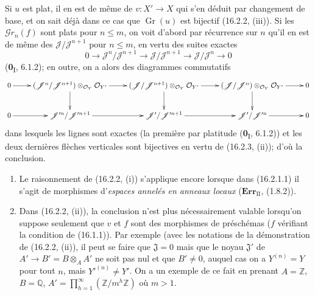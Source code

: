Si $u$ est plat, il en est de même de $v:X'\to X$ qui s'en déduit par
changement de base, et on sait déjà dans ce cas que $\operatorname{Gr}(u)$ est
bijectif (16.2.2, (iii)). Si les $\mathscr{G}r_n(f)$ sont plats pour
$n\leq m$, on voit d'abord par récurrence sur $n$ qu'il en est de même des
$\mathscr{J}/\mathscr{J}^{n+1}$ pour $n\leq m$, en vertu des suites exactes
\[
  0\longrightarrow\mathscr{J}^n/\mathscr{J}^{n+1}
  \longrightarrow\mathscr{J}/\mathscr{J}^{n+1}
  \longrightarrow\mathscr{J}/\mathscr{J}^n
  \longrightarrow 0
\]
(\textbf{0}\textsubscript{I}, 6.1.2); en outre, on a alors des diagrammes commutatifs
\[
  \xymatrix{
    0 \ar[r] &
    (\mathscr{J}^n/\mathscr{J}^{n+1})
      \otimes_{\mathcal{O}_Y}\mathcal{O}_{Y'}
      \ar[r]\ar[d] &
    (\mathscr{J}/\mathscr{J}^{n+1})
      \otimes_{\mathcal{O}_Y}\mathcal{O}_{Y'}
      \ar[r]\ar[d] &
    (\mathscr{J}/\mathscr{J}^n)
      \otimes_{\mathcal{O}_Y}\mathcal{O}_{Y'}
      \ar[r]\ar[d] & 0 \\
    0 \ar[r] &
    \mathscr{J}'^n/\mathscr{J}'^{n+1}
      \ar[r] &
    \mathscr{J}'/\mathscr{J}'^{n+1}
      \ar[r] &
    \mathscr{J}'/\mathscr{J}'^n
      \ar[r] & 0
  }
\]
dans lesquels les lignes sont exactes (la première par platitude
(\textbf{0}\textsubscript{I}, 6.1.2)) et les deux dernières flèches verticales sont
bijectives en vertu de (16.2.3, (ii)); d'où la conclusion.

\begin{remarks}[16.2.5]
\label{IV.16.2.5}
\begin{enumerate}
\item[(i)] Le raisonnement de (16.2.2, (i)) s'applique encore lorsque dans
(16.2.1.1) il s'agit de morphismes d'\emph{espaces annelés en anneaux locaux}
($\mathbf{Err}_{\mathrm{II}}$, (1.8.2)).
\item[(ii)] Dans (16.2.2, (ii)), la conclusion n'est plus nécessairement valable
lorsqu'on suppose seulement que $v$ et $f$ sont des morphismes de préschémas
($f$ vérifiant la condition de (16.1.1)). Par exemple (avec les notations de la
démonstration de (16.2.2, (ii)), il peut se faire que $\mathfrak{J}=0$ mais que
le noyau $\mathfrak{J}'$ de $A'\to B'=B\otimes_A A'$ ne soit pas nul et que
$B'\neq 0$, auquel cas on a $Y^{(n)}=Y$ pour tout $n$, mais
$Y'^{(n)}\neq Y'$. On a un exemple de ce fait en prenant
$A=\mathbb{Z}$, $B=\mathbb{Q}$,
$A'=\prod_{h=1}^{\infty}(\mathbb{Z}/m^h\mathbb{Z})$ où $m>1$.
\end{enumerate}
\end{remarks}

